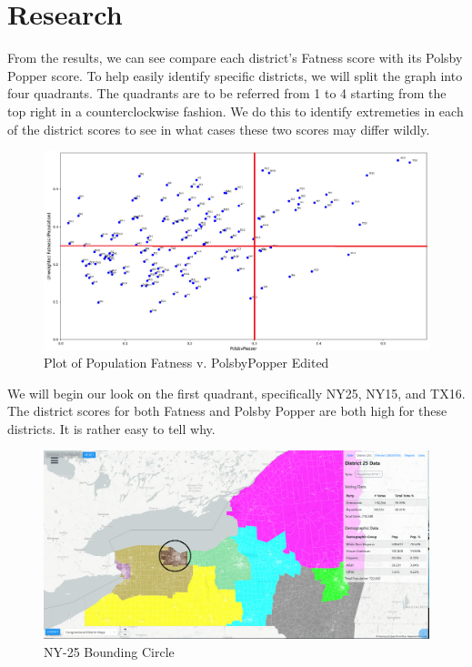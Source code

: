 \documentclass[letterpaper]{article}
\begin{document}
\section{Research}
From the results, we can see compare each district's Fatness score with its Polsby Popper score. To help easily identify specific districts, we will split the graph into four quadrants. The quadrants are to be referred from 1 to 4 starting from the top right in a counterclockwise fashion. We do this to identify extremeties in each of the district scores to see in what cases these two scores may differ wildly.
\begin{figure}[H]
	\includegraphics[width=\linewidth]{./figures/fatnessPopulationVpolsbyPopperEdited.png}
	\caption{Plot of Population Fatness v. PolsbyPopper Edited}
	\label{fig:datapointsEdited}
\end{figure}

We will begin our look on the first quadrant, specifically NY25, NY15, and TX16. The district scores for both Fatness and Polsby Popper are both high for these districts. It is rather easy to tell why.

\begin{figure}[H]
	\includegraphics[width=\linewidth]{./figures/NY-25-BoundingCircle.png}
	\caption{NY-25 Bounding Circle}
	\label{fig:ny25boundingCircle}
\end{figure}
\end{document}
